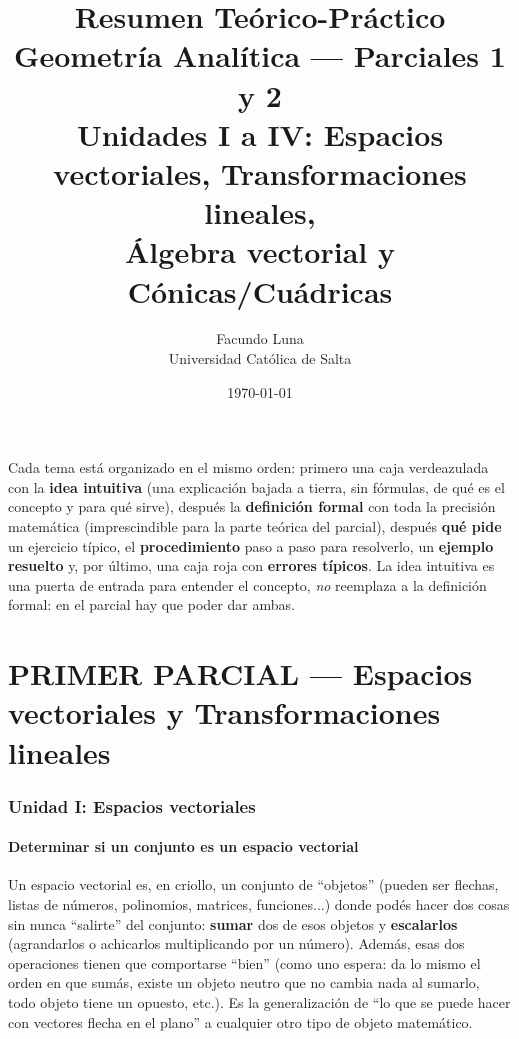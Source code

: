 \documentclass[11pt,a4paper]{article}
\title{\textbf{\Huge Resumen Teórico-Práctico}\\[0.3cm]
\Large Geometría Analítica --- Parciales 1 y 2\\[0.2cm]
\normalsize Unidades I a IV: Espacios vectoriales, Transformaciones lineales,\\
Álgebra vectorial y Cónicas/Cuádricas}
\author{Facundo Luna\\ \small Universidad Católica de Salta}
\date{\today}
\begin{document}
\maketitle
\tableofcontents
\newpage

\begin{teoria}
Cada tema está organizado en el mismo orden: primero una caja verdeazulada con la
\textbf{idea intuitiva} (una explicación bajada a tierra, sin fórmulas, de qué es el
concepto y para qué sirve), después la \textbf{definición formal} con toda la precisión
matemática (imprescindible para la parte teórica del parcial), después \textbf{qué pide}
un ejercicio típico, el \textbf{procedimiento} paso a paso para resolverlo, un
\textbf{ejemplo resuelto} y, por último, una caja roja con \textbf{errores típicos}. La
idea intuitiva es una puerta de entrada para entender el concepto, \emph{no} reemplaza a
la definición formal: en el parcial hay que poder dar ambas.
\end{teoria}

\part{PRIMER PARCIAL --- Espacios vectoriales y Transformaciones lineales}

\section{Unidad I: Espacios vectoriales}

\subsection{Determinar si un conjunto es un espacio vectorial}

\begin{intuicion}
Un espacio vectorial es, en criollo, un conjunto de ``objetos'' (pueden ser flechas,
listas de números, polinomios, matrices, funciones...) donde podés hacer dos cosas sin
nunca ``salirte'' del conjunto: \textbf{sumar} dos de esos objetos y \textbf{escalarlos}
(agrandarlos o achicarlos multiplicando por un número). Además, esas dos operaciones
tienen que comportarse ``bien'' (como uno espera: da lo mismo el orden en que sumás, existe
un objeto neutro que no cambia nada al sumarlo, todo objeto tiene un opuesto, etc.). Es la
generalización de ``lo que se puede hacer con vectores flecha en el plano'' a cualquier
otro tipo de objeto matemático.
\end{intuicion}
\end{document}
